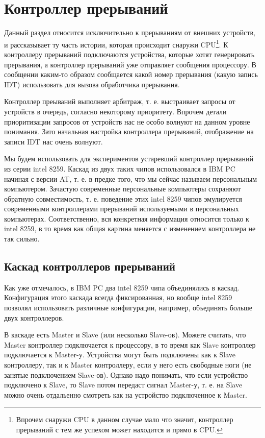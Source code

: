 \section{Контроллер прерываний}

Данный раздел относится исключительно к прерываниям от внешних устройств, и
рассказывает ту часть истории, которая происходит снаружи CPU\footnote{Впрочем
снаружи CPU в данном случае мало что значит, контроллер прерываний с тем же
успехом может находится и прямо в CPU.}. К контроллеру прерываний подключаются
устройства, которые хотят генерировать прерывания, а контроллер прерываний уже
отправляет сообщения процессору. В сообщении каким-то образом сообщается какой
номер прерывания (какую запись IDT) использовать для вызова обработчика
прерывания.

Контроллер преываний выполняет арбитраж, т. е. выстраивает запросы от устройств
в очередь, согласно некоторому приоритету. Впрочем детали приоритизации запросов
от устройств нас не особо волнуют на данном уровне понимания. Зато начальная
настройка контроллера прерываний, отображение на записи IDT нас очень волнуют.

Мы будем использовать для экспериментов устаревший контроллер прерываний из
серии intel 8259. Каскад из двух таких чипов использовался в IBM PC начиная с
версии AT, т. е. в предке того, что мы сейчас называем персональным компьютером.
Зачастую современные персональные компьютеры сохраняют обратную совместимость,
т. е. поведение этих intel 8259 чипов эмулируется современными контроллерами
прерываний используемыми в персональных компьютерах. Соответственно, вся
конкретная информация относится только к intel 8259, в то время как общая
картина меняется с изменением контроллера не так сильно.

\subsection{Каскад контроллеров прерываний}

Как уже отмечалось, в IBM PC два intel 8259 чипа объединялись в каскад.
Конфигурация этого каскада всегда фиксированная, но вообще intel 8259 позволял
использовать различные конфигурации, например, объединять больше двух
контроллеров.

В каскаде есть Master и Slave (или несколько Slave-ов). Можете считать, что
Master контроллер подключается к процессору, в то время как Slave контроллер
подключается к Master-у. Устройства могут быть подключены как к Slave
контроллеру, так и к Master контроллеру, если у него есть свободные ноги (не
занятые подключением Slave-ов). Однако надо понимать, что если устройство
подключено к Slave, то Slave потом передаст сигнал Master-у, т. е. на Slave
можно очень отдальенно смотреть как на устройство подключенное к Master.

